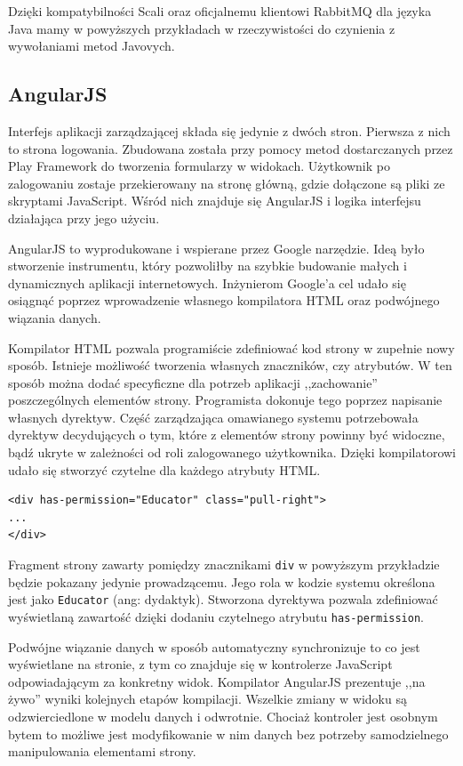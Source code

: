 \documentclass[brudnopis]{xmgr}
\begin{document}
Dzięki kompatybilności Scali oraz oficjalnemu klientowi RabbitMQ dla języka Java mamy w powyższych przykładach w rzeczywistości do czynienia z wywołaniami metod Javovych.

\subsection{AngularJS}

Interfejs aplikacji zarządzającej składa się jedynie z dwóch stron. Pierwsza z nich to strona logowania. Zbudowana została przy pomocy metod dostarczanych przez Play Framework do tworzenia formularzy w widokach. Użytkownik po zalogowaniu zostaje przekierowany na stronę główną, gdzie dołączone są pliki ze skryptami JavaScript. Wśród nich znajduje się AngularJS i logika interfejsu działająca przy jego użyciu.

AngularJS to wyprodukowane i wspierane przez Google narzędzie. Ideą było stworzenie instrumentu, który pozwoliłby na szybkie budowanie małych i dynamicznych aplikacji internetowych. Inżynierom Google'a cel udało się osiągnąć poprzez wprowadzenie własnego kompilatora HTML oraz podwójnego wiązania danych.

Kompilator HTML pozwala programiście zdefiniować kod strony w zupełnie nowy sposób. Istnieje możliwość tworzenia własnych znaczników, czy atrybutów. W ten sposób można dodać specyficzne dla potrzeb aplikacji ,,zachowanie'' poszczególnych elementów strony. Programista dokonuje tego poprzez napisanie własnych dyrektyw. Część zarządzająca omawianego systemu potrzebowała dyrektyw decydujących o tym, które z elementów strony powinny być widoczne, bądź ukryte w zależności od roli zalogowanego użytkownika. Dzięki kompilatorowi udało się stworzyć czytelne dla każdego atrybuty HTML.

\begin{verbatim}
<div has-permission="Educator" class="pull-right">
...
</div>
\end{verbatim}

Fragment strony zawarty pomiędzy znacznikami \texttt{div} w powyższym przykładzie będzie pokazany jedynie prowadzącemu. Jego rola w kodzie systemu określona jest jako \texttt{Educator} (ang: dydaktyk). Stworzona dyrektywa pozwala zdefiniować wyświetlaną zawartość dzięki dodaniu czytelnego atrybutu \texttt{has-permission}.

Podwójne wiązanie danych w sposób automatyczny synchronizuje to co jest wyświetlane na stronie, z tym co znajduje się w kontrolerze JavaScript odpowiadającym za konkretny widok. Kompilator AngularJS prezentuje ,,na żywo'' wyniki kolejnych etapów kompilacji. Wszelkie zmiany w widoku są odzwierciedlone w modelu danych i odwrotnie. Chociaż kontroler jest osobnym bytem to możliwe jest modyfikowanie w nim danych bez potrzeby samodzielnego manipulowania elementami strony.  
\end{document}
